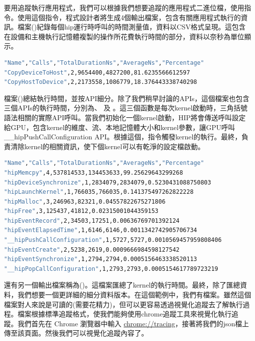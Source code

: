 要用追蹤執行應用程式，我們可以根據我們想要追蹤的應用程式二進位檔，使用指令。使用這個指令，程式設計者將生成4個輸出檔案，包含有關應用程式執行的資訊。檔案()紀錄每個hip運行時呼叫的時間測量值，資料以CSV格式呈現。這包含在設備和主機執行記憶體複製的操作所花費執行時間的部分，資料以奈秒為單位顯示。

\begin{lstlisting}[language=bash, caption={應用程式追蹤模式下\term{results.copy\_stats.csv}的輸出}, label={lst:results.copy_stats.csv output}]
"Name","Calls","TotalDurationNs","AverageNs","Percentage"
"CopyDeviceToHost",2,9654400,4827200,81.6235566612597
"CopyHostToDevice",2,2173558,1086779,18.376443338740298
\end{lstlisting}

檔案()總結執行時間，並按API細分。除了我們稍早討論的APIs，這個檔案也包含三個APIs的執行時間，分別為、 及 。這三個函數是每次kernel啟動時，三角括號語法相關的實際API呼叫。當我們初始化一個kernel啟動，HIP將會傳送呼叫設定給GPU，包含kernel的維度、流、本地記憶體大小和kernel參數，讓GPU呼叫\_\_hipPushCallConfiguration API。根據這個，指令觸發kernel的執行。最終，負責清除kernel的相關資訊，使下個kernel可以有乾淨的設定檔啟動。

\begin{lstlisting}[language=bash, caption={應用程式追蹤模式下\term{results.hip\_stats.csv}的輸出}, label={results.hip_stats.csv output}]
"Name","Calls","TotalDurationNs","AverageNs","Percentage"
"hipMemcpy",4,537814533,134453633,99.25629643299268
"hipDeviceSynchronize",1,2834079,2834079,0.5230431088750803
"hipLaunchKernel",1,766035,766035,0.141375497262822228
"hipMalloc",3,246963,82321,0.04557822675271806
"hipFree",3,125437,41812,0.02315001044359153
"hipEventRecord",2,34503,17251,0.00636769701392124
"hipEventElapsedTime",1,6146,6146,0.0011342742905706734
"__hipPushCallConfiguration",1,5727,5727,0.0010569457959808406
"hipEventCreate",2,5238,2619,0.0009666984598127542
"hipEventSynchronize",1,2794,2794,0.0005156463338520113
"__hipPopCallConfiguration",1,2793,2793,0.0005154617789723219
\end{lstlisting}

還有另一個輸出檔案稱為()。這檔案匯總了kernel的執行時間。最終，除了匯總資料，我們想要一個更詳細的細分資料版本。在這個範例中，我們有檔案。雖然這個檔案對人來說是可讀的(需要花精力)，但可以更容易透過視覺化追蹤去了解執行過程。檔案根據標準追蹤格式，使我們能夠使用chrome追蹤工具來視覺化執行追蹤。我們首先在 Chrome 瀏覽器中輸入 \url{chrome://tracing}，接著將我們的json檔上傳至該頁面。然後我們可以視覺化追蹤內容了。

